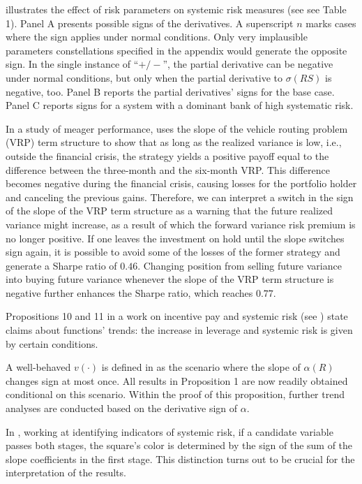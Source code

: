 \documentclass[11pt]{book}
\begin{document}
\cite{loffler2018pitfalls} illustrates the effect of
risk parameters on systemic risk measures (see see Table 1). Panel A presents possible
signs of the derivatives. A superscript $n$ marks cases where the
sign applies under normal conditions. Only very implausible parameters
constellations specified in the appendix would generate the opposite
sign. In the single instance of ``$+/-$'', the partial derivative
can be negative under normal conditions, but only when the partial
derivative to $\sigma(RS)$ is negative, too. Panel B reports the
partial derivatives' signs for the base case. Panel C reports signs
for a system with a dominant bank of high systematic risk.

In a study of meager performance, \cite{bardgett2019inferring} uses the slope of
the vehicle routing problem (VRP) term structure to show that as long as the realized
variance is low, i.e., outside the financial crisis, the strategy
yields a positive payoff equal to the difference between the three-month
and the six-month VRP. This difference becomes negative during the
financial crisis, causing losses for the portfolio holder and canceling
the previous gains. Therefore, we can interpret a switch in the sign
of the slope of the VRP term structure as a warning that the future
realized variance might increase, as a result of which the forward
variance risk premium is no longer positive. If one leaves the investment
on hold until the slope switches sign again, it is possible to avoid some of
the losses of the former strategy and generate a Sharpe ratio of $0.46$.
Changing position from selling future variance into buying future
variance whenever the slope of the VRP term structure is negative
further enhances the Sharpe ratio, which reaches $0.77$.

Propositions 10 and 11 in a work on incentive pay and systemic risk (see \cite{albuquerque2019incentive}) state
claims about functions' trends: the increase in leverage and systemic
risk is given by certain conditions.

A well-behaved $v\left(\cdot\right)$ is defined in \cite{de2019strategic}
as the scenario where the slope of $\alpha\left(R\right)$ changes
sign at most once. All results in Proposition 1 are now readily obtained
conditional on this scenario. Within the proof of this proposition,
further trend analyses are conducted based on the derivative sign
of $\alpha$.

In \cite{hartwig2020identifying}, working at identifying indicators of
systemic risk, if a candidate variable passes
both stages, the square's color is determined by the sign of the sum
of the slope coefficients in the first stage. This distinction turns
out to be crucial for the interpretation of the results.
\end{document}
